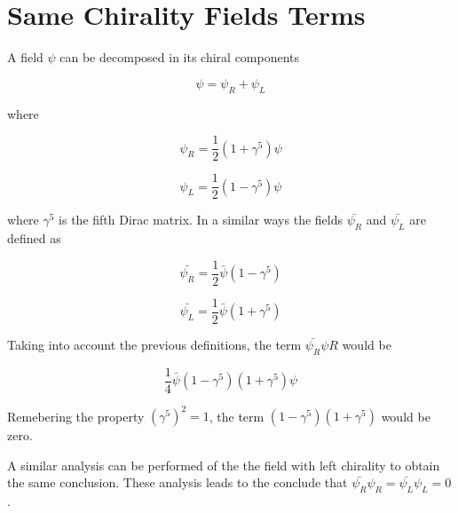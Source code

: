 \chapter{Same Chirality Fields Terms} \label{app: samechirality}

A field $\psi$ can be decomposed in its chiral components

$$ \psi = \psi_{R} + \psi_{L} $$

where 

$$ \psi_{R} = \frac{1}{2}\left(1 + \gamma^{5}\right)\psi $$

$$ \psi_{L} = \frac{1}{2}\left(1 - \gamma^{5}\right)\psi $$

where $\gamma^{5}$ is the fifth Dirac matrix. In a similar ways the fields $\bar{\psi_{R}}$ and $\bar{\psi_{L}}$ are defined as  

$$ \bar{\psi_{R}} = \frac{1}{2}\bar{\psi}\left(1 - \gamma^{5}\right) $$

$$ \bar{\psi_{L}} = \frac{1}{2}\bar{\psi}\left(1 + \gamma^{5}\right) $$

Taking into account the previous definitions, the term $\bar{\psi_{R}}\psi{R}$ would be

$$\frac{1}{4}\bar{\psi}\left(1 - \gamma^{5}\right)\left(1+\gamma^{5}\right)\psi$$

Remebering the property $\left(\gamma^{5}\right)^{2} = 1$, the term $\left(1 - \gamma^{5}\right)\left(1+\gamma^{5}\right)$ would be zero.

A similar analysis can be performed of the the field with left chirality to obtain the same conclusion. These analysis leads to the conclude that $\bar{\psi_{R}}\psi_{R} = \bar{\psi_{L}}\psi_{L} = 0$. 



